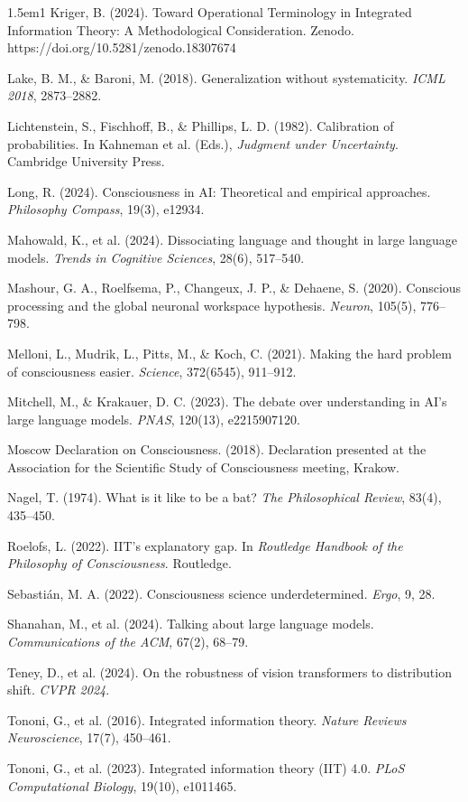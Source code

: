 \documentclass[12pt,a4paper]{article}
\begin{document}
\begin{hangparas}{1.5em}{1}
Kriger, B. (2024). Toward Operational Terminology in Integrated Information Theory: A Methodological Consideration. Zenodo. https://doi.org/10.5281/zenodo.18307674

Lake, B. M., \& Baroni, M. (2018). Generalization without systematicity. \textit{ICML 2018}, 2873--2882.

Lichtenstein, S., Fischhoff, B., \& Phillips, L. D. (1982). Calibration of probabilities. In Kahneman et al. (Eds.), \textit{Judgment under Uncertainty}. Cambridge University Press.

Long, R. (2024). Consciousness in AI: Theoretical and empirical approaches. \textit{Philosophy Compass}, 19(3), e12934.

Mahowald, K., et al. (2024). Dissociating language and thought in large language models. \textit{Trends in Cognitive Sciences}, 28(6), 517--540.

Mashour, G. A., Roelfsema, P., Changeux, J. P., \& Dehaene, S. (2020). Conscious processing and the global neuronal workspace hypothesis. \textit{Neuron}, 105(5), 776--798.

Melloni, L., Mudrik, L., Pitts, M., \& Koch, C. (2021). Making the hard problem of consciousness easier. \textit{Science}, 372(6545), 911--912.

Mitchell, M., \& Krakauer, D. C. (2023). The debate over understanding in AI's large language models. \textit{PNAS}, 120(13), e2215907120.

Moscow Declaration on Consciousness. (2018). Declaration presented at the Association for the Scientific Study of Consciousness meeting, Krakow.

Nagel, T. (1974). What is it like to be a bat? \textit{The Philosophical Review}, 83(4), 435--450.

Roelofs, L. (2022). IIT's explanatory gap. In \textit{Routledge Handbook of the Philosophy of Consciousness}. Routledge.

Sebasti\'{a}n, M. A. (2022). Consciousness science underdetermined. \textit{Ergo}, 9, 28.

Shanahan, M., et al. (2024). Talking about large language models. \textit{Communications of the ACM}, 67(2), 68--79.

Teney, D., et al. (2024). On the robustness of vision transformers to distribution shift. \textit{CVPR 2024}.

Tononi, G., et al. (2016). Integrated information theory. \textit{Nature Reviews Neuroscience}, 17(7), 450--461.

Tononi, G., et al. (2023). Integrated information theory (IIT) 4.0. \textit{PLoS Computational Biology}, 19(10), e1011465.
\end{hangparas}
\end{document}
